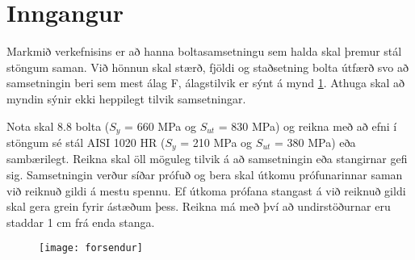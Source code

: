 \documentclass[12pt, draft, isbabel]{rureport}
\begin{document}
\maketitle

\tableofcontents

\listoffixmes

\clearpage

\section{Inngangur}\label{ch::inngangur}

Markmið verkefnisins er að hanna boltasamsetningu sem halda skal þremur stál stöngum saman. 
Við hönnun skal stærð, fjöldi og staðsetning bolta útfærð svo að samsetningin beri sem mest álag F, álagstilvik er sýnt á mynd \ref{fig::forsendur}. 
Athuga skal að myndin sýnir ekki heppilegt tilvik samsetningar. 

Nota skal 8.8 bolta ($S_y$ = 660 MPa og $S_{ut}$ = 830 MPa) og reikna með að efni í stöngum sé stál AISI 1020 HR ($S_y$ = 210 MPa og $S_{ut}$ = 380 MPa) eða sambærilegt. 
Reikna skal öll möguleg tilvik á að samsetningin eða stangirnar gefi sig. Samsetningin verður síðar prófuð og bera skal útkomu prófunarinnar saman við reiknuð gildi á mestu spennu. 
Ef útkoma prófana stangast á við reiknuð gildi skal gera grein fyrir ástæðum þess. 
Reikna má með því að undirstöðurnar eru staddar 1 cm frá enda stanga.

\begin{figure}[b]
	\centering
	\texttt{[image: forsendur]}
	\caption{}
	\label{fig::forsendur}
\end{figure}





\printbibliography
\end{document}
